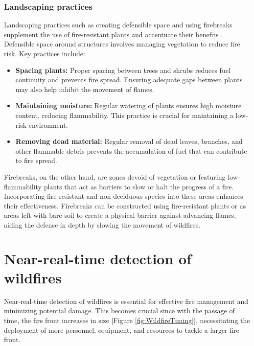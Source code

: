 \documentclass[
  12 pt,
]{Nemilov}
\begin{document}
\subsection{Landscaping practices}\label{landscaping-practices}

Landscaping practices such as creating defensible space and using firebreaks supplement the use of fire-resistant plants and accentuate their benefits \citep{dennis1999fire, kent2019firescaping}. Defensible space around structures involves managing vegetation to reduce fire risk. Key practices include:

\begin{itemize}
\item
  \textbf{Spacing plants:} Proper spacing between trees and shrubs reduces fuel continuity and prevents fire spread. Ensuring adequate gaps between plants may also help inhibit the movement of flames.
\item
  \textbf{Maintaining moisture:} Regular watering of plants ensures high moisture content, reducing flammability. This practice is crucial for maintaining a low-risk environment.
\item
  \textbf{Removing dead material:} Regular removal of dead leaves, branches, and other flammable debris prevents the accumulation of fuel that can contribute to fire spread.
\end{itemize}

Firebreaks, on the other hand, are zones devoid of vegetation or featuring low-flammability plants that act as barriers to slow or halt the progress of a fire. Incorporating fire-resistant and non-deciduous species into these areas enhances their effectiveness. Firebreaks can be constructed using fire-resistant plants or as areas left with bare soil to create a physical barrier against advancing flames, aiding the defense in depth by slowing the movement of wildfires.

\chapter{Near-real-time detection of wildfires}\label{near-real-time-detection-of-wildfires}

Near-real-time detection of wildfires is essential for effective fire management and minimizing potential damage. This becomes crucial since with the passage of time, the fire front increases in size {[}Figure \ref{fig:WildfireTiming}{]}, necessitating the deployment of more personnel, equipment, and resources to tackle a larger fire front.
\end{document}
